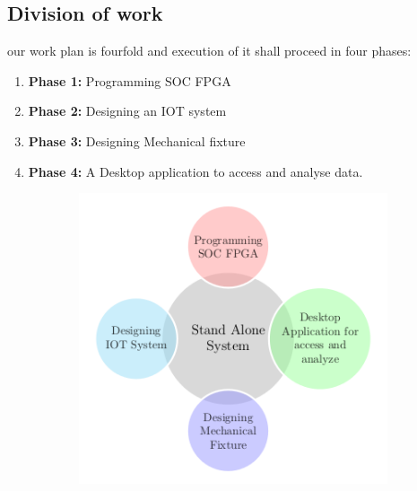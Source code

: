 \documentclass{FR16}
\begin{document}
\subsection{Division of work}
our work plan is fourfold and execution of it shall proceed in four phases:
\begin{enumerate}
     \item  \textbf{Phase 1:} Programming SOC FPGA 
    \item  \textbf{Phase 2:} Designing an IOT system
    \item \textbf{Phase 3:}  Designing Mechanical fixture
    \item \textbf{Phase 4:} A Desktop application to access and analyse data.
\end{enumerate}
  \begin{figure}[H]
    \begin{subfigure}{\textwidth}
    \includegraphics[scale=1]{smart-bubbles.png} 
    \label{fig:DJp1}
    \end{subfigure}
 

\label{fig6}
\end{figure}
\end{document}
